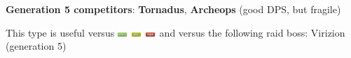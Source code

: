 \documentclass[8pt,aspectratio=169,compress]{beamer}
\newcommand{\fightingfull}{\includegraphics[height=0.15cm]{../../images/type/full/Fighting.png}}
\newcommand{\bugfull}{\includegraphics[height=0.15cm]{../../images/type/full/Bug.png}}
\newcommand{\grassfull}{\includegraphics[height=0.15cm]{../../images/type/full/Grass.png}}
\begin{document}
\begin{frame}
\begin{tiny}
\begin{block}{}
\begin{center}
\textbf{Generation 5 competitors}: \textbf{Tornadus}, \textbf{Archeops} (good DPS, but fragile)
\end{center}
\end{block}

\begin{block}{}\begin{center}
This type is useful versus \grassfull~\bugfull~\fightingfull~and versus the following raid boss: Virizion (generation 5)
\end{center}
\end{block}

\end{tiny}
\end{frame}


\end{document}
